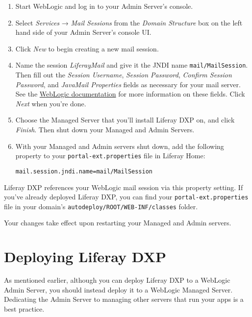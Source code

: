 \begin{enumerate}
\def\labelenumi{\arabic{enumi}.}
\item
  Start WebLogic and log in to your Admin Server's console.
\item
  Select \emph{Services} → \emph{Mail Sessions} from the \emph{Domain
  Structure} box on the left hand side of your Admin Server's console
  UI.
\item
  Click \emph{New} to begin creating a new mail session.
\item
  Name the session \emph{LiferayMail} and give it the JNDI name
  \texttt{mail/MailSession}. Then fill out the \emph{Session Username},
  \emph{Session Password}, \emph{Confirm Session Password}, and
  \emph{JavaMail Properties} fields as necessary for your mail server.
  See the
  \href{http://docs.oracle.com/middleware/1221/wls/FMWCH/pagehelp/Mailcreatemailsessiontitle.html}{WebLogic
  documentation} for more information on these fields. Click \emph{Next}
  when you're done.
\item
  Choose the Managed Server that you'll install Liferay DXP on, and
  click \emph{Finish}. Then shut down your Managed and Admin Servers.
\item
  With your Managed and Admin servers shut down, add the following
  property to your \texttt{portal-ext.properties} file in Liferay Home:

\begin{verbatim}
mail.session.jndi.name=mail/MailSession
\end{verbatim}
\end{enumerate}

Liferay DXP references your WebLogic mail session via this property
setting. If you've already deployed Liferay DXP, you can find your
\texttt{portal-ext.properties} file in your domain's
\texttt{autodeploy/ROOT/WEB-INF/classes} folder.

Your changes take effect upon restarting your Managed and Admin servers.

\section{Deploying Liferay DXP}\label{deploying-liferay-dxp}

As mentioned earlier, although you can deploy Liferay DXP to a WebLogic
Admin Server, you should instead deploy it to a WebLogic Managed Server.
Dedicating the Admin Server to managing other servers that run your apps
is a best practice.

